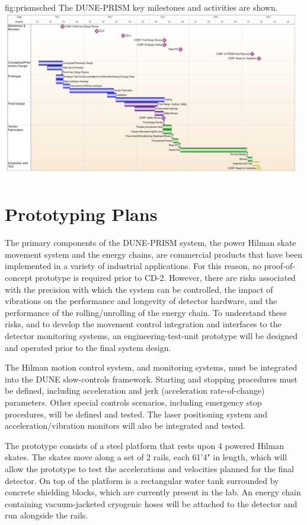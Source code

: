 \begin{dunefigure}{fig:prismsched}
{The DUNE-PRISM key milestones and activities are shown.}
\includegraphics[width=0.98\textwidth]{graphics/prism/PRISM2020DecR2.jpg}
\end{dunefigure}


\section{Prototyping Plans}
\label{sec:prism-qc}

The primary components of the DUNE-PRISM system, the power Hilman skate movement system and the energy chains, are commercial products that have been implemented in a variety of industrial applications. For this reason, no proof-of-concept prototype is required prior to CD-2. However, there are risks associated with the precision with which the system can be controlled, the impact of vibrations on the performance and longevity of detector hardware, and the performance of the rolling/unrolling of the energy chain. To understand these risks, and to develop the movement control integration and interfaces to the detector monitoring systems, an engineering-test-unit prototype will be designed and operated prior to the final system design.


The Hilman motion control system, and monitoring systems, must be integrated into the DUNE slow-controls framework. Starting and stopping procedures must be defined, including acceleration and jerk (acceleration rate-of-change) parameters. Other special controls scenarios, including emergency stop procedures, will be defined and tested. The laser positioning system and acceleration/vibration monitors will also be integrated and tested.

The prototype consists of a steel platform that rests upon 4 powered Hilman skates. The skates move along a set of 2 rails, each 61'4" in length, which will allow the prototype to test the accelerations and velocities planned for the final detector. On top of the platform is a rectangular water tank surrounded by concrete shielding blocks, which are currently present in the lab. An energy chain containing vacuum-jacketed cryogenic hoses will be attached to the detector and run alongside the rails.

